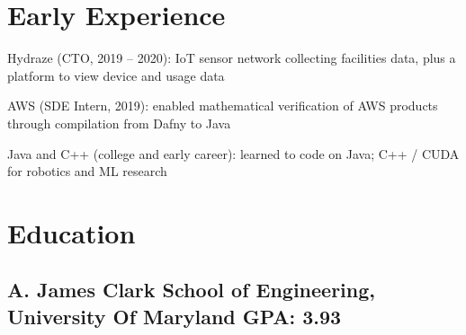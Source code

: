 \documentclass[print]{jack-resume}
\begin{document}
\section{Early Experience}
\vspace{1.4em}
\begin{tightemize}
    \item Hydraze (CTO, 2019 -- 2020): IoT sensor network collecting facilities data, plus a platform to view device and usage data
    \item AWS (SDE Intern, 2019): enabled mathematical verification of AWS products through compilation from Dafny to Java
    \item Java and C++ (college and early career): learned to code on Java; C++ / CUDA for robotics and ML research
\end{tightemize}
\sectionsep

\section{Education}
\subsection{A. James Clark School of Engineering, University Of Maryland \hfill GPA: 3.93}

\begin{minipage}[t]{0.04\textwidth}
    \hfill
\end{minipage}
\end{document}
